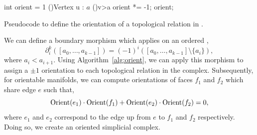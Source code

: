 \begin{algorithm}[ht!]


\SetStartEndCondition{ (}{)}{)}
\AlgoDisplayBlockMarkers\AlgoDisplayGroupMarkers\SetAlgoBlockMarkers{ \{}{ \}\ }%
\SetAlgoNoEnd\SetAlgoNoLine\DontPrintSemicolon
\SetStartEndCondition{ (}{)}{)}

\medskip
int orient = 1\;
\For(){Vertex u : $a$}{
	\lIf(){v>a}{
		orient *= -1;
	}
}
\Return orient;

\caption{Pseudocode to define the orientation of a topological relation in \asc.}
\label{alg:orient}
\end{algorithm}
\par We can define a boundary morphism which applies on an ordered ,
\begin{equation}
	\partial_i^k([a_0,\ldots, a_{k-1}]) = (-1)^{i}([a_0,\ldots, a_{k-1}]\setminus \{a_i\}),
\end{equation}
where $a_i < a_{i+1}$. Using Algorithm~\ref{alg:orient}, we can apply this morphism to assign a $\pm 1$ orientation to each topological relation in the complex. Subsequently, for orientable manifolds, we can compute orientations of faces $f_1$ and $f_2$ which share edge $e$ such that,
\begin{equation}
	\operatorname{Orient}(e_1)\cdot\operatorname{Orient}(f_1) + \operatorname{Orient}(e_2)\cdot\operatorname{Orient}(f_2) = 0,
\end{equation}
where $e_1$ and $e_2$ correspond to the edge up from $e$ to $f_1$ and $f_2$ respectively. Doing so, we create an oriented simplicial complex.

